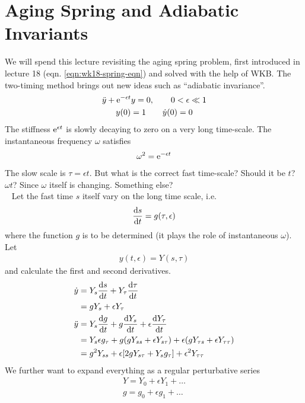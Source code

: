 \chapter[Aging Spring]{Aging Spring and Adiabatic Invariants}

We will spend this lecture revisiting the aging spring problem, first introduced in lecture 18 (eqn. \ref{eqn:wk18-spring-eqn}) and solved with the help of WKB. The two-timing method brings out new ideas such as ``adiabatic invariance''. 
\begin{gather*}
\ddot{y} + \mathrm{e}^{-\epsilon t} y = 0, \qquad 0 < \epsilon \ll 1 \\
y(0) = 1 \qquad \dot y(0) = 0
\end{gather*}
The stiffness $\mathrm{e}^{\epsilon t}$ is slowly decaying to zero on a very long time-scale. The instantaneous frequency $\omega$ satisfies
\begin{gather*}
	\omega^2 = \mathrm{e}^{-\epsilon t}
\end{gather*}
The slow scale is $\tau = \epsilon t$. But what is the correct fast time-scale? Should it be $t$? $\omega t$? Since $\omega$ itself is changing. Something else?\\
\ \newline
Let the fast time $s$ itself vary on the long time scale, i.e.
\begin{gather}
	\frac{\mathrm{d} s}{\mathrm{d} t} = g(\tau, \epsilon)
\end{gather}
where the function $g$ is to be determined (it plays the role of instantaneous $\omega$). Let
\begin{align*}
	y(t,\epsilon) = Y(s,\tau)
\end{align*} 
and calculate the first and second derivatives. 
\begin{align*}
	\dot y &= Y_s \frac{\mathrm{d} s}{\mathrm{d} t} + Y_\tau \frac{\mathrm{d} \tau}{\mathrm{d} t} \\
	&= gY_s + \epsilon Y_\tau \\
	\ddot{y} &=  Y_s \frac{\mathrm{d} g}{\mathrm{d} t} + g \frac{\mathrm{d} Y_s}{\mathrm{d} t} + \epsilon \frac{\mathrm{d} Y_\tau}{\mathrm{d} t} \\
	&= Y_s \epsilon g_\tau + g(gY_{ss} + \epsilon Y_{s\tau}) + \epsilon(gY_{\tau s} + \epsilon Y_{\tau \tau}) \\
	&= g^2 Y_{ss} + \epsilon [2g Y_{s\tau } + Y_s g_\tau ] + \epsilon^2 Y_{\tau \tau }
\end{align*}
We further want to expand everything as a regular perturbative series
\begin{gather*}
	Y = Y_0 + \epsilon Y_1 + \dots \\
	g = g_0 + \epsilon g_1 + \dots 
\end{gather*}
